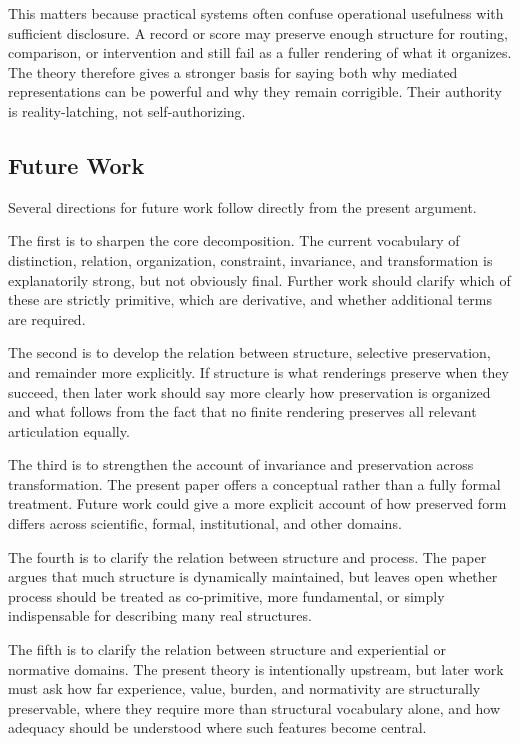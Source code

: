 \documentclass[11pt]{article}
\begin{document}
This matters because practical systems often confuse operational usefulness with sufficient disclosure. A record or score may preserve enough structure for routing, comparison, or intervention and still fail as a fuller rendering of what it organizes. The theory therefore gives a stronger basis for saying both why mediated representations can be powerful and why they remain corrigible. Their authority is reality-latching, not self-authorizing.

\subsection{Future Work}

Several directions for future work follow directly from the present argument.

The first is to sharpen the core decomposition. The current vocabulary of distinction, relation, organization, constraint, invariance, and transformation is explanatorily strong, but not obviously final. Further work should clarify which of these are strictly primitive, which are derivative, and whether additional terms are required.

The second is to develop the relation between structure, selective preservation, and remainder more explicitly. If structure is what renderings preserve when they succeed, then later work should say more clearly how preservation is organized and what follows from the fact that no finite rendering preserves all relevant articulation equally.

The third is to strengthen the account of invariance and preservation across transformation. The present paper offers a conceptual rather than a fully formal treatment. Future work could give a more explicit account of how preserved form differs across scientific, formal, institutional, and other domains.

The fourth is to clarify the relation between structure and process. The paper argues that much structure is dynamically maintained, but leaves open whether process should be treated as co-primitive, more fundamental, or simply indispensable for describing many real structures.

The fifth is to clarify the relation between structure and experiential or normative domains. The present theory is intentionally upstream, but later work must ask how far experience, value, burden, and normativity are structurally preservable, where they require more than structural vocabulary alone, and how adequacy should be understood where such features become central.
\end{document}
